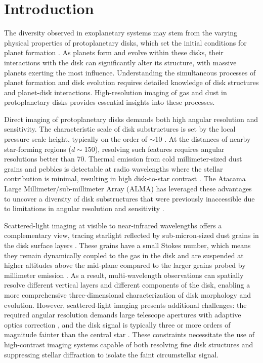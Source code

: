 \section{Introduction\label{sec:introduction}}

The diversity observed in exoplanetary systems may stem from the varying physical properties of protoplanetary disks, which set the initial conditions for planet formation \citep{williams_protoplanetary_2011}. As planets form and evolve within these disks, their interactions with the disk can significantly alter its structure, with massive planets exerting the most influence. Understanding the simultaneous processes of planet formation and disk evolution requires detailed knowledge of disk structures and planet-disk interactions. High-resolution imaging of gas and dust in protoplanetary disks provides essential insights into these processes.

Direct imaging of protoplanetary disks demands both high angular resolution and sensitivity. The characteristic scale of disk substructures is set by the local pressure scale height, typically on the order of $\sim$\SI{10}{\au} \citep{andrews_observations_2020}. At the distances of nearby star-forming regions ($d \sim$\SI{150}{\parsec}), resolving such features requires angular resolutions better than \SI{70}{\mas}. Thermal emission from cold millimeter-sized dust grains and pebbles is detectable at radio wavelengths where the stellar contribution is minimal, resulting in high disk-to-star contrast \citep{williams_protoplanetary_2011}. The Atacama Large Millimeter/sub-millimeter Array (ALMA) has leveraged these advantages to uncover a diversity of disk substructures that were previously inaccessible due to limitations in angular resolution and sensitivity \citep[e.g.,][]{andrews_disk_2018, perez_disk_2018, pinte_nine_2020}.

Scattered-light imaging at visible to near-infrared wavelengths offers a complementary view, tracing starlight reflected by sub-micron-sized dust grains in the disk surface layers \citep{benisty_optical_2023}. These grains have a small Stokes number, which means they remain dynamically coupled to the gas in the disk and are suspended at higher altitudes above the mid-plane compared to the larger grains probed by millimeter emission \citep{weidenschilling_aerodynamics_1977}. As a result, multi-wavelength observations can spatially resolve different vertical layers and different components of the disk, enabling a more comprehensive three-dimensional characterization of disk morphology and evolution. However, scattered-light imaging presents additional challenges: the required angular resolution demands large telescope apertures with adaptive optics correction \citep{guyon_extreme_2018}, and the disk signal is typically three or more orders of magnitude fainter than the central star \citep{benisty_optical_2023}. These constraints necessitate the use of high-contrast imaging systems capable of both resolving fine disk structures and suppressing stellar diffraction to isolate the faint circumstellar signal.

